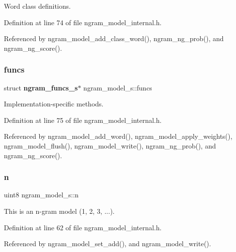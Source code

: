 Word class definitions. 



Definition at line 74 of file ngram\+\_\+model\+\_\+internal.\+h.



Referenced by ngram\+\_\+model\+\_\+add\+\_\+class\+\_\+word(), ngram\+\_\+ng\+\_\+prob(), and ngram\+\_\+ng\+\_\+score().

\mbox{\label{structngram__model__s_ad3d9d8ad9773f958a89534220eda6fb9}} 
\subsubsection{funcs}
{\footnotesize\ttfamily struct \textbf{ ngram\+\_\+funcs\+\_\+s}$\ast$ ngram\+\_\+model\+\_\+s\+::funcs}



Implementation-\/specific methods. 



Definition at line 75 of file ngram\+\_\+model\+\_\+internal.\+h.



Referenced by ngram\+\_\+model\+\_\+add\+\_\+word(), ngram\+\_\+model\+\_\+apply\+\_\+weights(), ngram\+\_\+model\+\_\+flush(), ngram\+\_\+model\+\_\+write(), ngram\+\_\+ng\+\_\+prob(), and ngram\+\_\+ng\+\_\+score().

\mbox{\label{structngram__model__s_a3c87bc1b678662a2c8930b3b8c33a80f}} 
\subsubsection{n}
{\footnotesize\ttfamily uint8 ngram\+\_\+model\+\_\+s\+::n}



This is an n-\/gram model (1, 2, 3, ...). 



Definition at line 62 of file ngram\+\_\+model\+\_\+internal.\+h.



Referenced by ngram\+\_\+model\+\_\+set\+\_\+add(), and ngram\+\_\+model\+\_\+write().

\mbox{\label{structngram__model__s_a710daed84ee676f79dcbf510fca238e8}} 
